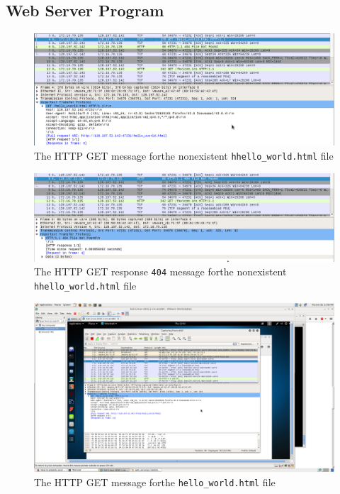 \documentclass[12pt]{article}
\title{\class{}\assign{}\hwNum{}}
\author{\name{}}
\date{\displaydate{date}}
\begin{document}
\maketitle
\newpage

\subsection{Web Server Program}

	\begin{figure}[h]
		\caption{The HTTP GET message forthe nonexistent \texttt{hhello\_world.html} file}
		\centering
		\includegraphics[width=\textwidth,height=\textheight,keepaspectratio,scale=0.5=0.5]{get_wrong}
	\end{figure}

	\begin{figure}[h]
		\caption{The HTTP GET response \texttt{404} message forthe nonexistent \texttt{hhello\_world.html} file}
		\centering
		\includegraphics[width=\textwidth,height=\textheight,keepaspectratio,scale=0.5=0.5]{404_resp}
	\end{figure}

	\begin{figure}[h]
		\caption{The HTTP GET message forthe \texttt{hello\_world.html} file}
		\centering
		\includegraphics[width=\textwidth,height=\textheight,keepaspectratio,scale=0.5=0.5]{get_right}
	\end{figure}
\end{document}
